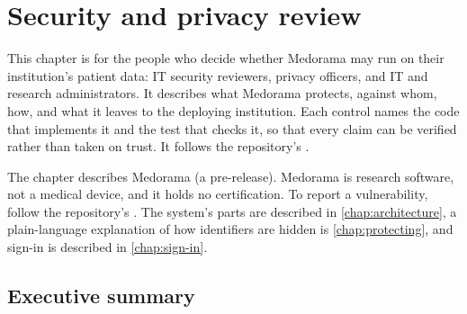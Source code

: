 \chapter{Security and privacy review}
\label{chap:security}

This chapter is for the people who decide whether Medorama may run on their institution's
patient data: IT security reviewers, privacy officers, and IT and research administrators. It
describes what Medorama protects, against whom, how, and what it leaves to the deploying
institution. Each control names the code that implements it and the test that checks it, so that
every claim can be verified rather than taken on trust. It follows the repository's
.

The chapter describes Medorama \mdversion{} (a pre-release). Medorama is research software, not a
medical device, and it holds no certification. To report a vulnerability, follow the
repository's . The system's parts are described in \cref{chap:architecture}, a
plain-language explanation of how identifiers are hidden is \cref{chap:protecting}, and sign-in
is described in \cref{chap:sign-in}.

\section{Executive summary}
\label{sec:security-summary}

